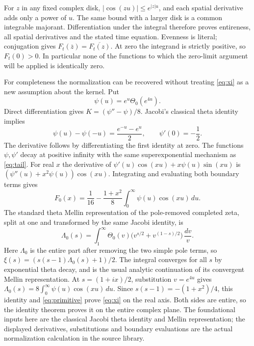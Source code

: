 \documentclass[11pt]{article}
\begin{document}
For $z$ in any fixed complex disk, $|\cos(zu)|\le e^{|z|u}$, and each
spatial derivative adds only a power of $u$. The same bound with a larger
disk is a common integrable majorant. Differentiation under the integral
therefore proves entireness, all spatial derivatives and the stated time
equation. Evenness is literal; conjugation gives
$F_t(\overline z)=\overline{F_t(z)}$. At zero the integrand is strictly
positive, so $F_t(0)>0$. In particular none of the functions to which the
zero-limit argument will be applied is identically zero.

For completeness the normalization can be recovered without treating
\eqref{eq:xi} as a new assumption about the kernel. Put
\[
 \psi(u)=e^u\Theta_0(e^{4u}).
\]
Direct differentiation gives $K=(\psi''-\psi)/8$. Jacobi's classical
theta identity implies
\[
 \psi(u)-\psi(-u)=\frac{e^{-u}-e^u}{2},\qquad \psi'(0)=-\frac12.
\]
The derivative follows by differentiating the first identity at zero.
The functions $\psi,\psi'$ decay at positive infinity with the same
superexponential mechanism as \eqref{eq:tail}. For real $x$ the derivative
of
$\psi'(u)\cos(xu)+x\psi(u)\sin(xu)$ is
$(\psi''(u)+x^2\psi(u))\cos(xu)$. Integrating and evaluating both boundary
terms gives
\begin{equation}\label{eq:primitive}
 F_0(x)=\frac1{16}-\frac{1+x^2}{8}
                    \int_0^\infty\psi(u)\cos(xu)\,du.
\end{equation}
The standard theta Mellin representation of the pole-removed completed
zeta, split at one and transformed by the same Jacobi identity, is
\[
 \Lambda_0(s)=\int_1^\infty\Theta_0(v)
                 \bigl(v^{s/2}+v^{(1-s)/2}\bigr)\,\frac{dv}{v}.
\]
Here $\Lambda_0$ is the entire part after removing the two simple pole
terms, so $\xi(s)=(s(s-1)\Lambda_0(s)+1)/2$. The integral converges for
all $s$ by exponential theta decay, and is the usual analytic continuation
of its convergent Mellin representation. At $s=(1+ix)/2$, substitution
$v=e^{4u}$ gives
$\Lambda_0(s)=8\int_0^\infty\psi(u)\cos(xu)\,du$.
Since $s(s-1)=-(1+x^2)/4$, this identity and \eqref{eq:primitive} prove
\eqref{eq:xi} on the real axis. Both sides are entire, so the identity
theorem proves it on the entire complex plane. The foundational inputs
here are the classical Jacobi theta identity and Mellin representation;
the displayed derivatives, substitutions and boundary evaluations are
the actual normalization calculation in the source library.
\end{document}
